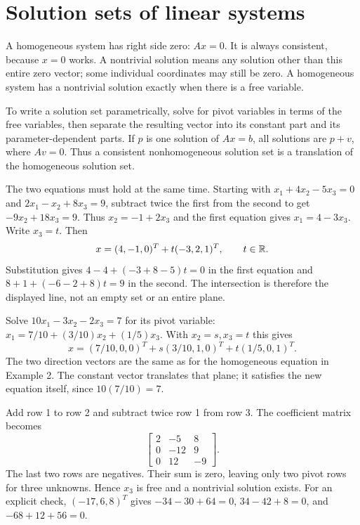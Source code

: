 \section{Solution sets of linear systems}
A homogeneous system has right side zero: $Ax=0$. It is always
consistent, because $x=0$ works. A nontrivial solution means any solution
other than this entire zero vector; some individual coordinates may still
be zero. A homogeneous system has a nontrivial solution exactly when
there is a free variable.

To write a solution set parametrically, solve for pivot variables in terms
of the free variables, then separate the resulting vector into its constant
part and its parameter-dependent parts. If $p$ is one solution of $Ax=b$,
all solutions are $p+v$, where $Av=0$. Thus a consistent nonhomogeneous
solution set is a translation of the homogeneous solution set.

The two equations must hold at the same time. Starting with
$x_1+4x_2-5x_3=0$ and $2x_1-x_2+8x_3=9$, subtract twice
the first from the second to get $-9x_2+18x_3=9$.
Thus $x_2=-1+2x_3$ and the first equation gives $x_1=4-3x_3$.
Write $x_3=t$. Then
\[x=(4,-1,0)^T+t(-3,2,1)^T,\qquad t\in\mathbb{R}.\]
Substitution gives $4-4+(-3+8-5)t=0$ in the first equation
and $8+1+(-6-2+8)t=9$ in the second. The intersection is
therefore the displayed line, not an empty set or an entire plane.

Solve $10x_1-3x_2-2x_3=7$ for its pivot variable:
$x_1=7/10+(3/10)x_2+(1/5)x_3$. With $x_2=s,x_3=t$ this gives
\[x=(7/10,0,0)^T+s(3/10,1,0)^T+t(1/5,0,1)^T.\]
The two direction vectors are the same as for the homogeneous equation
in Example 2. The constant vector translates that plane; it satisfies the
new equation itself, since $10(7/10)=7$.

Add row 1 to row 2 and subtract twice row 1 from row 3. The
coefficient matrix becomes
\[\begin{bmatrix}2&-5&8\\0&-12&9\\0&12&-9\end{bmatrix}.\]
The last two rows are negatives. Their sum is zero, leaving only two
pivot rows for three unknowns. Hence $x_3$ is free and a nontrivial
solution exists. For an explicit check, $(-17,6,8)^T$ gives
$-34-30+64=0$, $34-42+8=0$, and $-68+12+56=0$.

